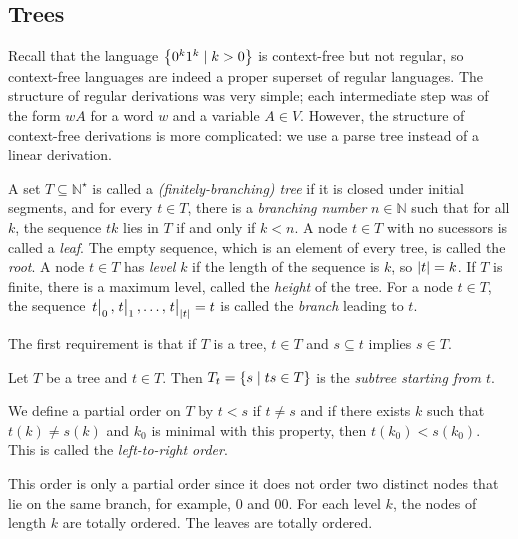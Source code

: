 \subsection{Trees}
Recall that the language \( \qty{0^k1^k \mid k > 0} \) is context-free but not regular, so context-free languages are indeed a proper superset of regular languages.
The structure of regular derivations was very simple; each intermediate step was of the form \( wA \) for a word \( w \) and a variable \( A \in V \).
However, the structure of context-free derivations is more complicated: we use a parse tree instead of a linear derivation.
\begin{definition}
	A set \( T \subseteq \mathbb N^\star \) is called a \emph{(finitely-branching) tree} if it is closed under initial segments, and for every \( t \in T \), there is a \emph{branching number} \( n \in \mathbb N \) such that for all \( k \), the sequence \( tk \) lies in \( T \) if and only if \( k < n \).
	A node \( t \in T \) with no sucessors is called a \emph{leaf}.
	The empty sequence, which is an element of every tree, is called the \emph{root}.
	A node \( t \in T \) has \emph{level} \( k \) if the length of the sequence is \( k \), so \( \abs{t} = k \).
	If \( T \) is finite, there is a maximum level, called the \emph{height} of the tree.
	For a node \( t \in T \), the sequence \( \eval{t}_0, \eval{t}_1, \dots, \eval{t}_{\abs{t}} = t \) is called the \emph{branch} leading to \( t \).
\end{definition}
\begin{remark}
	The first requirement is that if \( T \) is a tree, \( t \in T \) and \( s \subseteq t \) implies \( s \in T \).
\end{remark}
\begin{example}
\end{example}
\begin{definition}
	Let \( T \) be a tree and \( t \in T \).
	Then \( T_t = \qty{s \mid ts \in T} \) is the \emph{subtree starting from \( t \)}.
\end{definition}
\begin{definition}
	We define a partial order on \( T \) by \( t < s \) if \( t \neq s \) and if there exists \( k \) such that \( t(k) \neq s(k) \) and \( k_0 \) is minimal with this property, then \( t(k_0) < s(k_0) \).
	This is called the \emph{left-to-right order}.
\end{definition}
\begin{remark}
	This order is only a partial order since it does not order two distinct nodes that lie on the same branch, for example, \( 0 \) and \( 00 \).
	For each level \( k \), the nodes of length \( k \) are totally ordered.
	The leaves are totally ordered.
\end{remark}

